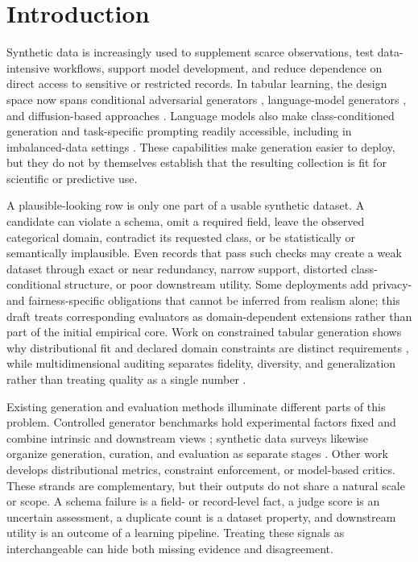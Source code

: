 \section{Introduction}
\label{sec:introduction}

Synthetic data is increasingly used to supplement scarce observations, test
data-intensive workflows, support model development, and reduce dependence on
direct access to sensitive or restricted records. In tabular learning, the
design space now spans conditional adversarial generators
\citep{xu2019ctgan}, language-model generators
\citep{borisov2023great,solatorio2023realtabformer}, and diffusion-based
approaches \citep{kotelnikov2023tabddpm,zhang2024tabsyn}. Language models also
make class-conditioned generation and task-specific prompting readily
accessible, including in imbalanced-data settings \citep{kim2024epic}. These
capabilities make generation easier to deploy, but they do not by themselves
establish that the resulting collection is fit for scientific or predictive
use.

A plausible-looking row is only one part of a usable synthetic dataset. A
candidate can violate a schema, omit a required field, leave the observed
categorical domain, contradict its requested class, or be statistically or
semantically implausible. Even records that pass such checks may create a weak
dataset through exact or near redundancy, narrow support, distorted
class-conditional structure, or poor downstream utility. Some deployments add
privacy- and fairness-specific obligations that cannot be inferred from
realism alone; this draft treats corresponding evaluators as domain-dependent
extensions rather than part of the initial empirical core. Work on constrained
tabular generation shows why distributional fit and declared domain
constraints are distinct requirements
\citep{stoian2024realistic}, while multidimensional auditing separates
fidelity, diversity, and generalization rather than treating quality as a
single number \citep{alaa2022faithful}.

Existing generation and evaluation methods illuminate different parts of this
problem. Controlled generator benchmarks hold experimental factors fixed and
combine intrinsic and downstream views \citep{kim2025evaluating}; synthetic
data surveys likewise organize generation, curation, and evaluation as
separate stages \citep{long2024survey}. Other work develops distributional
metrics, constraint enforcement, or model-based critics. These strands are
complementary, but their outputs do not share a natural scale or scope. A
schema failure is a field- or record-level fact, a judge score is an uncertain
assessment, a duplicate count is a dataset property, and downstream utility is
an outcome of a learning pipeline. Treating these signals as interchangeable
can hide both missing evidence and disagreement.


